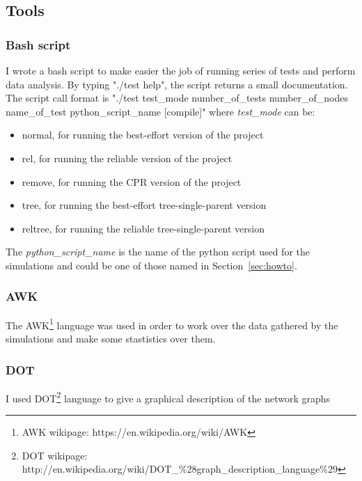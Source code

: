 \documentclass{article}
\begin{document}
	\subsection{Tools}
	
		\subsubsection{Bash script}
		\label{sec:bash}
		
I wrote a bash script to make easier the job of running series of tests and perform data analysis. By typing "./test help", the script returns a small documentation. The script call format is "./test test\_mode number\_of\_tests number\_of\_nodes name\_of\_test python\_script\_name [compile]" where \textit{test\_mode} can be:
\begin{itemize}
	\item normal, for running the best-effort version of the project
	\item rel, for running the reliable version of the project
	\item remove, for running the CPR version of the project
	\item tree, for running the best-effort tree-single-parent version
	\item reltree, for running the reliable tree-single-parent version
\end{itemize}
The \textit{python\_script\_name} is the name of the python script used for the simulations and could be one of those named in Section~\ref{sec:howto}.

		\subsubsection{AWK}

The AWK\footnote{AWK wikipage: https://en.wikipedia.org/wiki/AWK} language was used in order to work over the data gathered by the simulations and make some stastistics over them.

		\subsubsection{DOT}
		
I used DOT\footnote{DOT wikipage: http://en.wikipedia.org/wiki/DOT\_\%28graph\_description\_language\%29} language to give a graphical description of the network graphs
\clearpage
\end{document}
